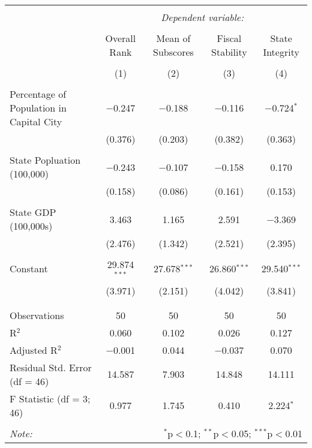 
\begin{tabular}{@{\extracolsep{5pt}}lcccc} 
\\[-1.8ex]\hline 
\hline \\[-1.8ex] 
 & \multicolumn{4}{c}{\textit{Dependent variable:}} \\ 
\cline{2-5} 
\\[-1.8ex] & Overall Rank & Mean of Subscores & Fiscal Stability & State Integrity \\ 
\\[-1.8ex] & (1) & (2) & (3) & (4)\\ 
\hline \\[-1.8ex] 
 Percentage of Population in Capital City & $-$0.247 & $-$0.188 & $-$0.116 & $-$0.724$^{*}$ \\ 
  & (0.376) & (0.203) & (0.382) & (0.363) \\ 
  & & & & \\ 
 State Popluation (100,000) & $-$0.243 & $-$0.107 & $-$0.158 & 0.170 \\ 
  & (0.158) & (0.086) & (0.161) & (0.153) \\ 
  & & & & \\ 
 State GDP (100,000s) & 3.463 & 1.165 & 2.591 & $-$3.369 \\ 
  & (2.476) & (1.342) & (2.521) & (2.395) \\ 
  & & & & \\ 
 Constant & 29.874$^{***}$ & 27.678$^{***}$ & 26.860$^{***}$ & 29.540$^{***}$ \\ 
  & (3.971) & (2.151) & (4.042) & (3.841) \\ 
  & & & & \\ 
\hline \\[-1.8ex] 
Observations & 50 & 50 & 50 & 50 \\ 
R$^{2}$ & 0.060 & 0.102 & 0.026 & 0.127 \\ 
Adjusted R$^{2}$ & $-$0.001 & 0.044 & $-$0.037 & 0.070 \\ 
Residual Std. Error (df = 46) & 14.587 & 7.903 & 14.848 & 14.111 \\ 
F Statistic (df = 3; 46) & 0.977 & 1.745 & 0.410 & 2.224$^{*}$ \\ 
\hline 
\hline \\[-1.8ex] 
\textit{Note:}  & \multicolumn{4}{r}{$^{*}$p$<$0.1; $^{**}$p$<$0.05; $^{***}$p$<$0.01} \\ 
\end{tabular} 
